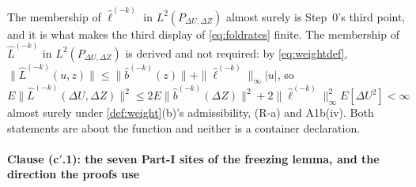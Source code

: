 The membership of $\hat\ell^{(-k)}$ in $L^{2}(P_{\Delta U,\Delta Z})$ almost surely is
 Step~0's third point, and it is what makes the third display of
\eqref{eq:foldrates} finite.
The membership of $\hat L^{(-k)}$ in $L^{2}(P_{\Delta U,\Delta Z})$ is derived and not required: by \eqref{eq:weightdef},
$\|\hat L^{(-k)}(u,z)\|\le\|\hat b^{(-k)}(z)\|+\|\hat\ell^{(-k)}\|_\infty|u|$, so
$E\|\hat L^{(-k)}(\Delta U,\Delta Z)\|^{2}\le
2E\|\hat b^{(-k)}(\Delta Z)\|^{2}+2\|\hat\ell^{(-k)}\|^{2}_\infty E[\Delta U^{2}]<\infty$ almost surely
under \cref{def:weight}(b)'s admissibility, (R-a) and A1b(iv). Both statements are about the
function and neither is a container declaration.

\paragraph{Clause \textup{(c$'$.1)}: the seven \textbf{Part-I} sites of the freezing lemma, and the direction the proofs use}

